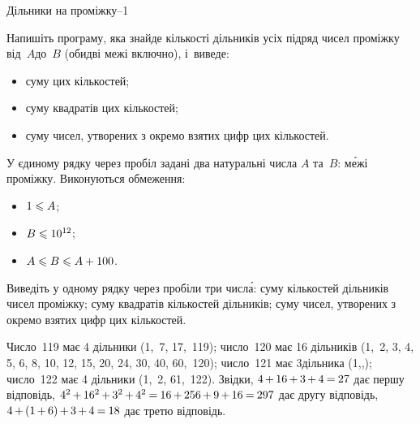 \begin{problemAllDefault}{Дільники на проміжку--1}\label{task:divisors-in-range-1}

Напишіть програму, яка знайде кількості дільників усіх підряд чисел проміжку від~$A$\nolinebreak[2] до~$B$ (обидві межі включно), і~виведе:
\begin{itemize}
\item
суму цих кількостей;
\item
суму квадратів цих кількостей;
\item
суму чисел, утворених з окремо взятих цифр цих кількостей.
\end{itemize}

\InputFile
У єдиному рядку через пробіл задані два натуральні числа $A$ та~$B$: м\'{е}жі проміжку. Виконуються обмеження:

\vspace{-1\baselineskip}

\begin{multicols}{3}
\begin{itemize}
\item
$1\leqslant A$;
\item
$B\leqslant10^{12}$;
\item
$A\leqslant B\leqslant A+100$.
\end{itemize}
\end{multicols}

\vspace{-0.5\baselineskip}

\myflfigaw{\hspace*{-0.5em}\begin{exampleSimple}{3.5em}{4.5em}%

\end{exampleSimple}\hspace*{-0.25em}}
\OutputFile
Виведіть у одному рядку через пробіли три числ\'{а}: суму кількостей дільників чисел проміжку; суму квадратів кількостей дільників; суму чисел, утворених з окремо взятих цифр цих кількостей.



\Note
Число~119 має 4 дільники (1,~7, 17,~119); число~120 має 16 дільників (1,~2, 3, 4, 5, 6, 8, 10, 12, 15, 20, 24, 30, 40, 60,~120); число~121 має 3\nolinebreak[3] дільника (1,,); число~122 має 4 дільники (1,~2, 61,~122).
%
Звідки, ${4\,{+}\,16\,{+}\,3\,{+}\,4}\dibbb{{=}}27$ дає першу відповідь,\hspace{0.25em plus 0.5em}
${4^2\,{+}\,16^2\,{+}\,3^2\,{+}\,4^2}\dibbb{{=}}{16\,{+}\,256\,{+}\,9\,{+}\,16}\dibbb{{=}}297$ дає другу відповідь,\hspace{0.25em plus 0.5em}
${4\,{+}\,(1\,{+}\,6)\,{+}\,3\,{+}\,4}\dibbb{{=}}18$ дає третю відповідь.

\end{problemAllDefault}